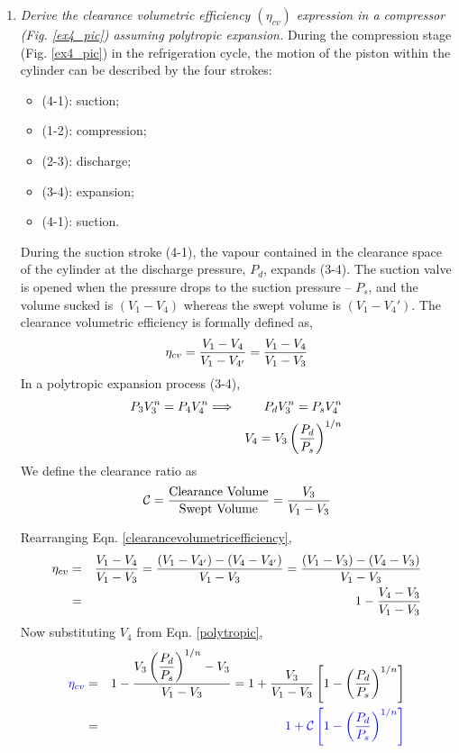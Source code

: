 \begin{enumerate}
\item \label{Ex4} {\it Derive the clearance volumetric efficiency $\left(\eta_{cv}\right)$ expression in a compressor (Fig. \ref{ex4_pic}) assuming polytropic expansion.}
During the compression stage (Fig. \ref{ex4_pic}) in the refrigeration cycle, the motion of the piston within the cylinder can be described by the four strokes:
\begin{itemize}
\item (4-1): suction;
\item (1-2): compression;
\item (2-3): discharge;
\item (3-4): expansion;
\item (4-1): suction.
\end{itemize}
During the suction stroke (4-1), the vapour contained in the clearance space of the cylinder at the discharge pressure, $P_{d}$, expands (3-4). The suction valve is opened when the pressure drops to the suction pressure -- $P_{s}$, and the volume sucked is $\left(V_{1}-V_{4}\right)$ whereas the swept volume is $\left(V_{1}-V_{4}'\right)$.  The clearance volumetric efficiency is formally defined as,
\begin{equation}
\eta_{cv}=\displaystyle\frac{V_{1}-V_{4}}{V_{1}-V_{4'}}=\displaystyle\frac{V_{1}-V_{4}}{V_{1}-V_{3}} 
\label{clearancevolumetricefficiency}
\end{equation}
In a polytropic expansion process (3-4),
\begin{eqnarray}
 P_{3}V_{3}^{n} = P_{4}V_{4}^{n} &\Longrightarrow& P_{d}V_{3}^{n}=P_{s}V_{4}^{n} \nonumber \\
&& V_{4}=V_{3}\left(\displaystyle\frac{P_{d}}{P_{s}}\right)^{1/n} \label{polytropic}
\end{eqnarray}
We define the clearance ratio as
\begin{displaymath}
\mathcal{C}=\displaystyle\frac{\text{Clearance Volume}}{\text{Swept Volume}} = \displaystyle\frac{V_{3}}{V_{1}-V_{3}}
\end{displaymath}

Rearranging Eqn. \ref{clearancevolumetricefficiency},
\begin{eqnarray}
\eta_{cv} &=& \displaystyle\frac{V_{1}-V_{4}}{V_{1}-V_{3}} = \displaystyle\frac{\left(V_{1}-V_{4'}\right)-\left(V_{4}-V_{4'}\right)}{V_{1}-V_{3}} = \displaystyle\frac{\left(V_{1}-V_{3}\right)-\left(V_{4}-V_{3}\right)}{V_{1}-V_{3}} \nonumber \\
         &=& 1 - \displaystyle\frac{V_{4}-V_{3}}{V_{1}-V_{3}} \nonumber
\end{eqnarray}
Now substituting $V_{4}$ from Eqn. \ref{polytropic},
\begin{eqnarray}
\textcolor{blue}{\eta_{cv}} &=& 1 - \displaystyle\frac{V_{3}\left(\displaystyle\frac{P_{d}}{P_{s}}\right)^{1/n}-V_{3}}{V_{1}-V_{3}}=1+\displaystyle\frac{V_{3}}{V_{1}-V_{3}}\left[1-\left(\displaystyle\frac{P_{d}}{P_{s}}\right)^{1/n}\right] \nonumber \\
         &=& \textcolor{blue}{1 + \mathcal{C}\left[1-\left(\displaystyle\frac{P_{d}}{P_{s}}\right)^{1/n}\right]}
\end{eqnarray}


\end{enumerate}
